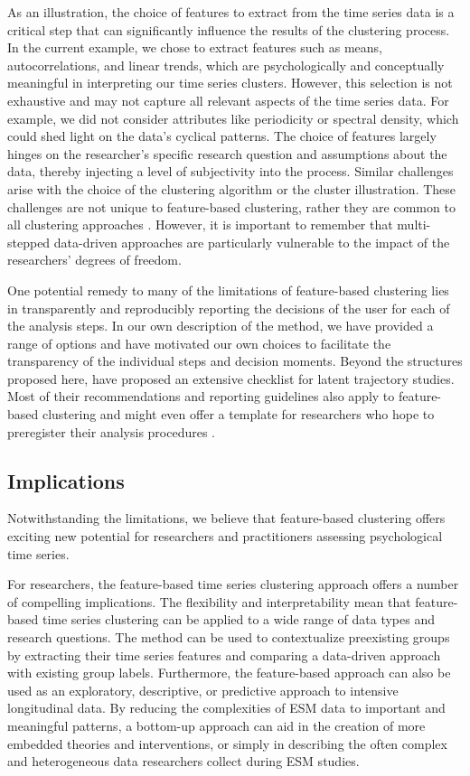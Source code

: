 \documentclass[man, 12pt, a4paper, mask, floatsintext]{apa7}
\theoremstyle{break}
\theoremstyle{plain}
\begin{document}
As an illustration, the choice of features to extract from the time series data is a critical step that can significantly influence the results of the clustering process. In the current example, we chose to extract features such as means, autocorrelations, and linear trends, which are psychologically and conceptually meaningful in interpreting our time series clusters. However, this selection is not exhaustive and may not capture all relevant aspects of the time series data. For example, we did not consider attributes like periodicity or spectral density, which could shed light on the data's cyclical patterns. The choice of features largely hinges on the researcher's specific research question and assumptions about the data, thereby injecting a level of subjectivity into the process. Similar challenges arise with the choice of the clustering algorithm or the cluster illustration. These challenges are not unique to feature-based clustering, rather they are common to all clustering approaches \citep{liao2005, horne2020}. However, it is important to remember that multi-stepped data-driven approaches are particularly vulnerable to the impact of the researchers' degrees of freedom.

One potential remedy to many of the limitations of feature-based clustering lies in transparently and reproducibly reporting the decisions of the user for each of the analysis steps. In our own description of the method, we have provided a range of options and have motivated our own choices to facilitate the transparency of the individual steps and decision moments. Beyond the structures proposed here, \citet{vandeschoot2017} have proposed an extensive checklist for latent trajectory studies. Most of their recommendations and reporting guidelines also apply to feature-based clustering and might even offer a template for researchers who hope to preregister their analysis procedures \citep[also see][]{kirtley2021}.

\subsection{Implications}
Notwithstanding the limitations, we believe that feature-based clustering offers exciting new potential for researchers and practitioners assessing psychological time series. 

For researchers, the feature-based time series clustering approach offers a number of compelling implications. The flexibility and interpretability mean that feature-based time series clustering can be applied to a wide range of data types and research questions. 
The method can be used to contextualize preexisting groups by extracting their time series features and comparing a data-driven approach with existing group labels. Furthermore, the feature-based approach can also be used as an exploratory, descriptive, or predictive approach to intensive longitudinal data. By reducing the complexities of ESM data to important and meaningful patterns, a bottom-up approach can aid in the creation of more embedded theories and interventions, or simply in describing the often complex and heterogeneous data researchers collect during ESM studies.
\end{document}
